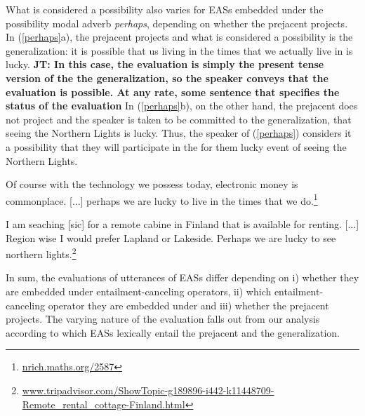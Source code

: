 \documentclass[11pt,fleqn]{article}
\newcommand{\6}{\mbox{$[\hspace*{-.6mm}[$}}
\newcommand{\9}{\mbox{$]\hspace*{-.6mm}]$}}
\newcommand{\jt}[1]{\textbf{\color{blue}JT: #1}}
\begin{document}
What is considered a possibility also varies for EASs embedded under the possibility modal adverb {\em perhaps}, depending on whether the prejacent projects. In (\ref{perhaps}a), the prejacent projects and what is considered a possibility is the generalization: it is possible that us living in the times that we actually live in is lucky.  \jt{In this case, the evaluation is simply the present tense version of the the generalization, so the speaker conveys that the evaluation is possible. At any rate, some sentence that specifies the status of the evaluation} In (\ref{perhaps}b), on the other hand, the prejacent does not project and the speaker is taken to be committed to the generalization, that seeing the Northern Lights is lucky. Thus, the speaker of (\ref{perhaps}) considers it a possibility that they will participate in the for them lucky event of seeing the Northern Lights. 

\begin{exe}
\ex\label{perhaps}

\begin{xlist}

\ex Of course with the technology we possess today, electronic money is commonplace. [...] perhaps we are lucky to live in the times that we do.\footnote{\url{nrich.maths.org/2587}}

\ex I am seaching [sic] for a remote cabine in Finland that is available for renting. [...]
Region wise I would prefer Lapland or Lakeside. Perhaps we are lucky to see northern lights.\footnote{\url{www.tripadvisor.com/ShowTopic-g189896-i442-k11448709-Remote_rental_cottage-Finland.html}}

\end{xlist}

\end{exe}
In sum, the evaluations of utterances of EASs differ depending on i) whether they are embedded under entailment-canceling operators, ii) which entailment-canceling operator they are embedded under and iii) whether the prejacent projects. The varying nature of the evaluation falls out from our analysis according to which EASs lexically entail the prejacent and the generalization. 
\end{document}
